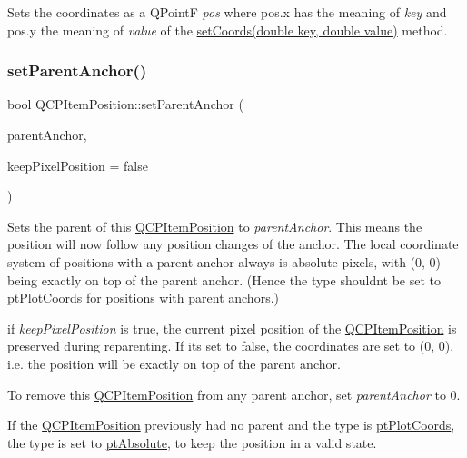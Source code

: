 Sets the coordinates as a Q\+PointF {\itshape pos} where pos.\+x has the meaning of {\itshape key} and pos.\+y the meaning of {\itshape value} of the \hyperlink{classQCPItemPosition_aa988ba4e87ab684c9021017dcaba945f}{set\+Coords(double key, double value)} method. \mbox{\label{classQCPItemPosition_ac094d67a95d2dceafa0d50b9db3a7e51}} 
\subsubsection{\texorpdfstring{set\+Parent\+Anchor()}{setParentAnchor()}}
{\footnotesize\ttfamily bool Q\+C\+P\+Item\+Position\+::set\+Parent\+Anchor (\begin{DoxyParamCaption}\item[{\hyperlink{classQCPItemAnchor}{Q\+C\+P\+Item\+Anchor} $\ast$}]{parent\+Anchor,  }\item[{bool}]{keep\+Pixel\+Position = {\ttfamily false} }\end{DoxyParamCaption})}

Sets the parent of this \hyperlink{classQCPItemPosition}{Q\+C\+P\+Item\+Position} to {\itshape parent\+Anchor}. This means the position will now follow any position changes of the anchor. The local coordinate system of positions with a parent anchor always is absolute pixels, with (0, 0) being exactly on top of the parent anchor. (Hence the type shouldn\textquotesingle{}t be set to \hyperlink{classQCPItemPosition_aad9936c22bf43e3d358552f6e86dbdc8ad5ffb8dc99ad73263f7010c77342294c}{pt\+Plot\+Coords} for positions with parent anchors.)

if {\itshape keep\+Pixel\+Position} is true, the current pixel position of the \hyperlink{classQCPItemPosition}{Q\+C\+P\+Item\+Position} is preserved during reparenting. If it\textquotesingle{}s set to false, the coordinates are set to (0, 0), i.\+e. the position will be exactly on top of the parent anchor.

To remove this \hyperlink{classQCPItemPosition}{Q\+C\+P\+Item\+Position} from any parent anchor, set {\itshape parent\+Anchor} to 0.

If the \hyperlink{classQCPItemPosition}{Q\+C\+P\+Item\+Position} previously had no parent and the type is \hyperlink{classQCPItemPosition_aad9936c22bf43e3d358552f6e86dbdc8ad5ffb8dc99ad73263f7010c77342294c}{pt\+Plot\+Coords}, the type is set to \hyperlink{classQCPItemPosition_aad9936c22bf43e3d358552f6e86dbdc8a564f5e53e550ead1ec5fc7fc7d0b73e0}{pt\+Absolute}, to keep the position in a valid state.

